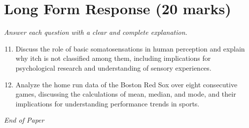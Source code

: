 \documentclass[12pt]{article}
\begin{document}
\section*{Long Form Response (20 marks)}
\textit{Answer each question with a clear and complete explanation.}
\begin{enumerate}[label=\arabic*.]
\setcounter{enumi}{10}
\item Discuss the role of basic somatosensations in human perception and explain why itch is not classified among them, including implications for psychological research and understanding of sensory experiences.
\item Analyze the home run data of the Boston Red Sox over eight consecutive games, discussing the calculations of mean, median, and mode, and their implications for understanding performance trends in sports.
\end{enumerate}

\vfill
\noindent\textit{End of Paper}
\end{document}
